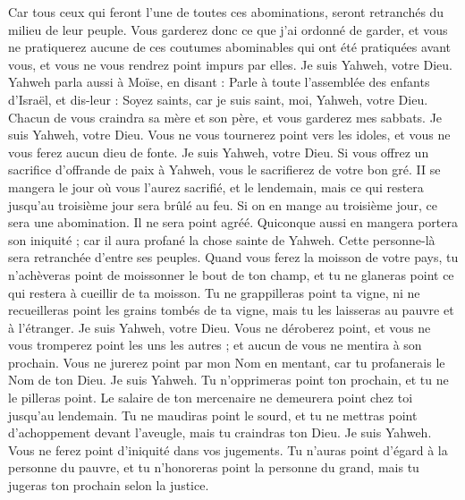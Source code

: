 \begin{multicols}{2}
Car tous ceux qui feront l'une de toutes ces abominations, seront retranchés du milieu de leur peuple.
Vous garderez donc ce que j'ai ordonné de garder, et vous ne pratiquerez aucune de ces coutumes abominables qui ont été pratiquées avant vous, et vous ne vous rendrez point impurs par elles. Je suis Yahweh, votre Dieu.
\VerseOne{}Yahweh parla aussi à Moïse, en disant :
Parle à toute l'assemblée des enfants d'Israël, et dis-leur : Soyez saints, car je suis saint, moi, Yahweh, votre Dieu.
Chacun de vous craindra sa mère et son père, et vous garderez mes sabbats. Je suis Yahweh, votre Dieu.
Vous ne vous tournerez point vers les idoles, et vous ne vous ferez aucun dieu de fonte. Je suis Yahweh, votre Dieu.
Si vous offrez un sacrifice d'offrande de paix à Yahweh, vous le sacrifierez de votre bon gré.
II se mangera le jour où vous l'aurez sacrifié, et le lendemain, mais ce qui restera jusqu'au troisième jour sera brûlé au feu.
Si on en mange au troisième jour, ce sera une abomination. Il ne sera point agréé.
Quiconque aussi en mangera portera son iniquité ; car il aura profané la chose sainte de Yahweh. Cette personne-là sera retranchée d'entre ses peuples.
Quand vous ferez la moisson de votre pays, tu n'achèveras point de moissonner le bout de ton champ, et tu ne glaneras point ce qui restera à cueillir de ta moisson.
Tu ne grappilleras point ta vigne, ni ne recueilleras point les grains tombés de ta vigne, mais tu les laisseras au pauvre et à l'étranger. Je suis Yahweh, votre Dieu.
Vous ne déroberez point, et vous ne vous tromperez point les uns les autres ; et aucun de vous ne mentira à son prochain.
Vous ne jurerez point par mon Nom en mentant, car tu profanerais le Nom de ton Dieu. Je suis Yahweh.
Tu n'opprimeras point ton prochain, et tu ne le pilleras point. Le salaire de ton mercenaire ne demeurera point chez toi jusqu'au lendemain.
Tu ne maudiras point le sourd, et tu ne mettras point d'achoppement devant l'aveugle, mais tu craindras ton Dieu. Je suis Yahweh.
Vous ne ferez point d'iniquité dans vos jugements. Tu n'auras point d'égard à la personne du pauvre, et tu n'honoreras point la personne du grand, mais tu jugeras ton prochain selon la justice.

\end{multicols}

